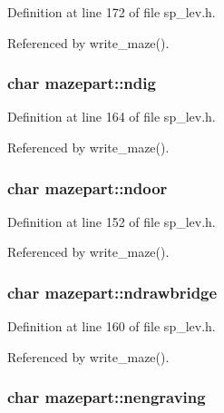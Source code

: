 Definition at line 172 of file sp\+\_\+lev.\+h.



Referenced by write\+\_\+maze().

\hypertarget{structmazepart_ac97fe77a6c1e89eb67eb53f43e5017b8}{
\subsubsection[{ndig}]{\setlength{\rightskip}{0pt plus 5cm}char mazepart\+::ndig}}\label{structmazepart_ac97fe77a6c1e89eb67eb53f43e5017b8}


Definition at line 164 of file sp\+\_\+lev.\+h.



Referenced by write\+\_\+maze().

\hypertarget{structmazepart_a8a2c8d4078ff76f6d3d250374637c599}{
\subsubsection[{ndoor}]{\setlength{\rightskip}{0pt plus 5cm}char mazepart\+::ndoor}}\label{structmazepart_a8a2c8d4078ff76f6d3d250374637c599}


Definition at line 152 of file sp\+\_\+lev.\+h.



Referenced by write\+\_\+maze().

\hypertarget{structmazepart_a20189e7cae9f4320ee13d4837a42cf80}{
\subsubsection[{ndrawbridge}]{\setlength{\rightskip}{0pt plus 5cm}char mazepart\+::ndrawbridge}}\label{structmazepart_a20189e7cae9f4320ee13d4837a42cf80}


Definition at line 160 of file sp\+\_\+lev.\+h.



Referenced by write\+\_\+maze().

\hypertarget{structmazepart_a5dd30fd46e000cc79f68b955338ad893}{
\subsubsection[{nengraving}]{\setlength{\rightskip}{0pt plus 5cm}char mazepart\+::nengraving}}\label{structmazepart_a5dd30fd46e000cc79f68b955338ad893}


